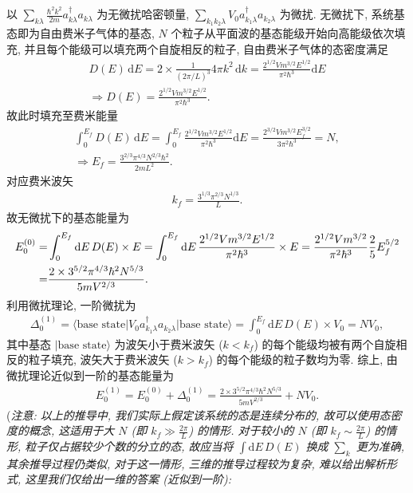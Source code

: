 \documentclass{assignment}
\begin{document}
\begin{sol}
    以 $\sum_{k\lambda}\frac{\hbar^2k^2}{2m}a_{k\lambda}^{\dagger}a_{k\lambda}$ 为无微扰哈密顿量, $\sum_{k_1k_2\lambda}V_0a_{k_1\lambda}^{\dagger}a_{k_2\lambda}$ 为微扰. 无微扰下, 系统基态即为自由费米子气体的基态, $N$ 个粒子从平面波的基态能级开始向高能级依次填充, 并且每个能级可以填充两个自旋相反的粒子, 自由费米子气体的态密度满足
    \begin{gather}
        D(E)\,\mathrm{d}E=2\times\frac{1}{(2\pi /L)^3}4\pi k^2\,\mathrm{d}k=\frac{2^{1/2}Vm^{3/2}E^{1/2}}{\pi^2\hbar^3}\mathrm{d}E\\
        \Longrightarrow D(E)=\frac{2^{1/2}Vm^{3/2}E^{1/2}}{\pi^2\hbar^3}.
    \end{gather}
    故此时填充至费米能量
    \begin{gather}
        \int_0^{E_f}D(E)\,\mathrm{d}E=\int_0^{E_f}\frac{2^{1/2}Vm^{3/2}E^{1/2}}{\pi^2\hbar^3}\mathrm{d}E=\frac{2^{3/2}Vm^{3/2}E_f^{3/2}}{3\pi^2\hbar^3}=N,\\
        \Longrightarrow E_f=\frac{3^{2/3}\pi^{4/3}N^{2/3}\hbar^2}{2mL^2}.
    \end{gather}
    对应费米波矢
    \begin{align}
        k_f=\frac{3^{1/3}\pi^{2/3}N^{1/3}}{L}.
    \end{align}
    故无微扰下的基态能量为
    \begin{align}
        \notag E_0^{(0)}=&\int_0^{E_f}\mathrm{d}E\,D(E)\times E=\int_0^{E_f}\mathrm{d}E\,\frac{2^{1/2}Vm^{3/2}E^{1/2}}{\pi^2\hbar^3}\times E=\frac{2^{1/2}Vm^{3/2}}{\pi^2\hbar^3}\frac{2}{5}E_f^{5/2}\\
        =&\frac{2\times 3^{5/2}\pi^{4/3}\hbar^2N^{5/3}}{5mV^{2/3}}.
    \end{align}
    利用微扰理论, 一阶微扰为
    \begin{align}
        \Delta_0^{(1)}=\langle\text{base state}\rvert V_0a_{k_1\lambda}^{\dagger}a_{k_2\lambda}\lvert\text{base state}\rangle=\int_0^{E_f}\mathrm{d}E\,D(E)\times V_0=NV_0,
    \end{align}
    其中基态 $\lvert\text{base state}\rangle$ 为波矢小于费米波矢 ($k<k_f$) 的每个能级均被有两个自旋相反的粒子填充, 波矢大于费米波矢 ($k>k_f$) 的每个能级的粒子数均为零. 综上, 由微扰理论近似到一阶的基态能量为
    \begin{align}
        E_0^{(1)}=E_0^{(0)}+\Delta_0^{(1)}=\frac{2\times 3^{5/2}\pi^{4/3}\hbar^2N^{5/3}}{5mV^{2/3}}+NV_0.
    \end{align}
    (\textit{注意: 以上的推导中, 我们实际上假定该系统的态是连续分布的, 故可以使用态密度的概念, 这适用于大 $N$ (即 $k_f\gg\frac{2\pi}{L}$) 的情形. 对于较小的 $N$ (即 $k_f\sim\frac{2\pi}{L}$) 的情形, 粒子仅占据较少个数的分立的态, 故应当将 $\int\mathrm{d}E\,D(E)$ 换成 $\sum_{k}$ 更为准确, 其余推导过程仍类似, 对于这一情形, 三维的推导过程较为复杂, 难以给出解析形式, 这里我们仅给出一维的答案 (近似到一阶):
}
\end{sol}
\end{document}
